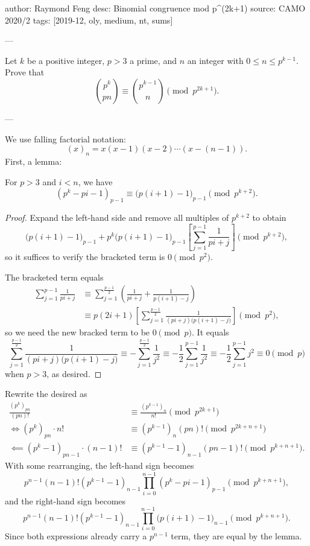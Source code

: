author: Raymond Feng
desc: Binomial congruence mod p^(2k+1)
source: CAMO 2020/2
tags: [2019-12, oly, medium, nt, sums]

---

Let $k$ be a positive integer, $p>3$ a prime, and $n$ an integer with $0\le n\le p^{k-1}$. Prove that \[\binom{p^k}{pn}\equiv\binom{p^{k-1}}n\pmod{p^{2k+1}}.\]

---

We use falling factorial notation: \[(x)_n=x(x-1)(x-2)\cdots(x-(n-1)).\]
First, a lemma:
\begin{lemma*}
    For $p>3$ and $i<n$, we have \[\left(p^k-pi-1\right)_{p-1}\equiv\big(p(i+1)-1\big)_{p-1}\pmod{p^{k+2}}.\]
\end{lemma*}
\begin{proof}
    Expand the left-hand side and remove all multiples of $p^{k+2}$ to obtain \[\big(p(i+1)-1\big)_{p-1}+p^k\big(p(i+1)-1\big)_{p-1}\left[\sum_{j=1}^{p-1}\frac1{pi+j}\right]\pmod{p^{k+2}},\]
    so it suffices to verify the bracketed term is $0\pmod{p^2}$.

    The bracketed term equals
    \begin{align*}
        \sum_{j=1}^{p-1}\frac1{pi+j}&\equiv\sum_{j=1}^{\frac{p-1}2}\left(\frac1{pi+j}+\frac1{p(i+1)-j}\right)\\
        &\equiv p(2i+1)\left[\sum_{j=1}^{\frac{p-1}2}\frac1{(pi+j)\big(p(i+1)-j\big)}\right]\pmod{p^2},
    \end{align*}
    so we need the new bracked term to be $0\pmod p$. It equals \[\sum_{j=1}^{\frac{p-1}2}\frac1{(pi+j)\big(p(i+1)-j\big)}\equiv-\sum_{j=1}^{\frac{p-1}2}\frac1{j^2}\equiv-\frac12\sum_{j=1}^{p-1}\frac1{j^2}\equiv-\frac12\sum_{j=1}^{p-1}j^2\equiv0\pmod p\]
    when $p>3$, as desired.
\end{proof}

Rewrite the desired as
\begin{align*}
    \frac{\left(p^k\right)_{pn}}{(pn)!}&\equiv\frac{\left(p^{k-1}\right)_n}{n!}\pmod{p^{2k+1}}\\
    \iff\left(p^k\right)_{pn}\cdot n!&\equiv\left(p^{k-1}\right)_n(pn)!\pmod{p^{2k+n+1}}\\
        \impliedby\left(p^k-1\right)_{pn-1}\cdot(n-1)!&\equiv\left(p^{k-1}-1\right)_{n-1}(pn-1)!\pmod{p^{k+n+1}}.
\end{align*}
With some rearranging, the left-hand sign becomes \[p^{n-1}(n-1)!\left(p^{k-1}-1\right)_{n-1}\prod_{i=0}^{n-1}\left(p^k-pi-1\right)_{p-1}\pmod{p^{k+n+1}},\]
and the right-hand sign becomes \[p^{n-1}(n-1)!\left(p^{k-1}-1\right)_{n-1}\prod_{i=0}^{n-1}\big(p(i+1)-1\big)_{n-1}\pmod{p^{k+n+1}}.\]
Since both expressions already carry a $p^{n-1}$ term, they are equal by the lemma.
